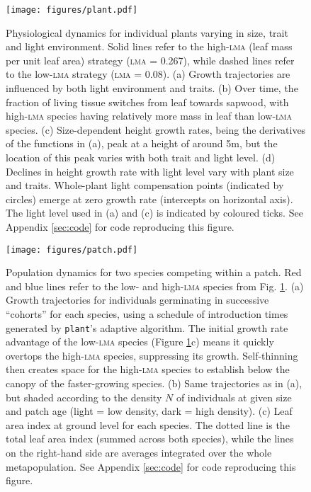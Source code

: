 \documentclass[a4paper,11pt]{article}
\newcommand{\plant}{\texttt{plant}}
\begin{document}
\newpage

\begin{figure}[h!]
\centering
\texttt{[image: figures/plant.pdf]}
\caption{Physiological dynamics for individual plants varying in size,
 trait and light environment. Solid lines refer to the high-\textsc{lma} (leaf mass per unit leaf area) strategy (\textsc{lma} =
 0.267), while dashed lines refer to the low-\textsc{lma} strategy
 (\textsc{lma} = 0.08). (a) Growth trajectories are influenced by
 both light environment and traits. (b) Over time, the fraction of
 living tissue switches from leaf towards sapwood, with high-\textsc{lma} species having relatively more mass in leaf than low-\textsc{lma} species. (c)
 Size-dependent height growth rates, being the derivatives of the functions in (a), peak at a height of around
 5m, but the location of this peak varies with both trait and light
 level. (d) Declines in height growth rate with light level vary with plant size
 and traits. Whole-plant light compensation points (indicated by
 circles) emerge at zero growth rate (intercepts on horizontal axis).
 The light level used in (a) and (c) is indicated by
 coloured ticks. See Appendix \ref{sec:code} for code
 reproducing this figure.}
\label{fig:plant}
\end{figure}

\newpage

\begin{figure}[h!]
\centering
\texttt{[image: figures/patch.pdf]}
\caption{Population dynamics for two species competing within a patch.
 Red and blue lines refer to the low- and high-\textsc{lma} species from
 Fig. \ref{fig:plant}. (a) Growth trajectories
 for individuals germinating in successive ``cohorts'' for each
 species, using a schedule of introduction times generated by
 {\plant}'s adaptive algorithm. The initial growth rate advantage of
 the low-\textsc{lma} species (Figure \ref{fig:plant}c) means it
 quickly overtops the high-\textsc{lma} species, suppressing its
 growth. Self-thinning then creates space for the high-\textsc{lma}
 species to establish below the canopy of the faster-growing species.
 (b) Same trajectories as in (a), but shaded
 according to the density $N$ of individuals at given size and patch
 age (light = low density, dark = high density). (c) Leaf area
 index at ground level for each species. The dotted line is the
 total leaf area index (summed across both species), while the lines on
 the right-hand side are averages integrated over the whole
 metapopulation. See Appendix \ref{sec:code} for code
 reproducing this figure.}
\label{fig:patch}
\end{figure}
\end{document}
